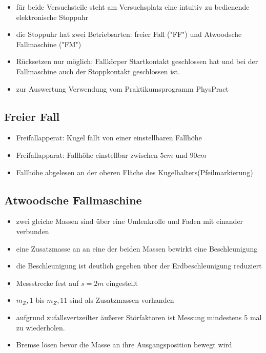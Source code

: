 \documentclass{protokoll}
\begin{document}
\begin{itemize}
\item für beide Versuchsteile steht am Versuchsplatz eine 
intuitiv zu bedienende elektronische Stoppuhr
\item die Stoppuhr hat zwei Betriebsarten: freier Fall ("FF") 
und Atwoodsche Fallmaschine ("FM")
\item Rücksetzen nur möglich: Fallkörper Startkontakt geschlossen 
hat und bei der Fallmaschine auch der Stoppkontakt geschlossen ist.
\item zur Auswertung Verwendung vom Praktikumsprogramm PhysPract
\end{itemize}


\subsection{Freier Fall}


\begin{itemize}
\item Freifallapperat: Kugel fällt von einer einstellbaren Fallhöhe
\item Freifallapparat: Fallhöhe einstellbar zwischen $5cm$  und $90cm$
\item Fallhöhe abgelesen an der oberen Fläche des Kugelhalters(Pfeilmarkierung)
\end{itemize}


\subsection{Atwoodsche Fallmaschine}

\begin{itemize}
\item zwei gleiche Massen sind über eine Umlenkrolle und Faden mit einander
verbunden
\item eine Zusatzmasse an an eine der beiden Massen bewirkt eine Beschleunigung
\item die Beschleunigung ist deutlich gegeben über der Erdbeschleunigung reduziert
\item Messstrecke fest auf $s = 2m $ eingestellt
\item $m_Z,1$ bis $m_Z,11$ sind als Zusatzmassen vorhanden
\item aufgrund zufallsvertzeilter äußerer Störfaktoren ist Messung 
mindestens 5 mal zu wiederholen.
\item Bremse lösen bevor die Masse an ihre Ausgangsposition bewegt wird
\end{itemize}
\end{document}

